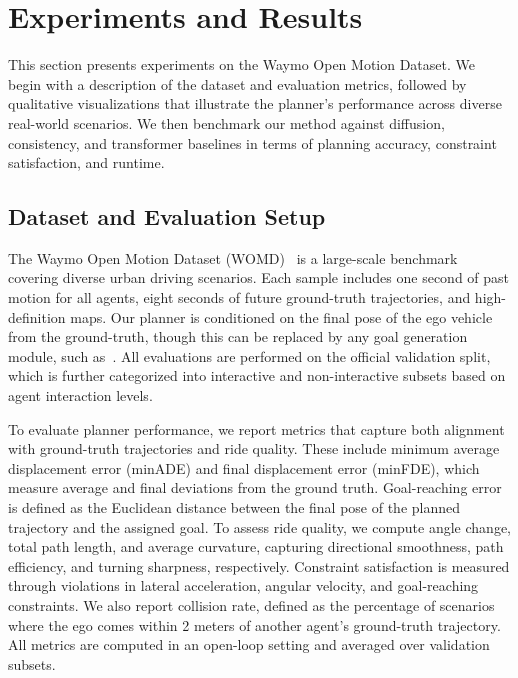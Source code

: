 \documentclass[conference]{IEEEtran}
\begin{document}
\section{Experiments and Results}
This section presents experiments on the Waymo Open Motion Dataset. We begin with a description of the dataset and evaluation metrics, followed by qualitative visualizations that illustrate the planner’s performance across diverse real-world scenarios. We then benchmark our method against diffusion, consistency, and transformer baselines in terms of planning accuracy, constraint satisfaction, and runtime.

\subsection{Dataset and Evaluation Setup}
The Waymo Open Motion Dataset (WOMD)~\cite{womd} is a large-scale benchmark covering diverse urban driving scenarios. Each sample includes one second of past motion for all agents, eight seconds of future ground-truth trajectories, and high-definition maps. Our planner is conditioned on the final pose of the ego vehicle from the ground-truth, though this can be replaced by any goal generation module, such as~\cite{goalflow}. All evaluations are performed on the official validation split, which is further categorized into interactive and non-interactive subsets based on agent interaction levels.

To evaluate planner performance, we report metrics that capture both alignment with ground-truth trajectories and ride quality. These include minimum average displacement error (minADE) and final displacement error (minFDE), which measure average and final deviations from the ground truth. Goal-reaching error is defined as the Euclidean distance between the final pose of the planned trajectory and the assigned goal. To assess ride quality, we compute angle change, total path length, and average curvature, capturing directional smoothness, path efficiency, and turning sharpness, respectively. Constraint satisfaction is measured through violations in lateral acceleration, angular velocity, and goal-reaching constraints. We also report collision rate, defined as the percentage of scenarios where the ego comes within 2 meters of another agent’s ground-truth trajectory. All metrics are computed in an open-loop setting and averaged over validation subsets.
\end{document}
